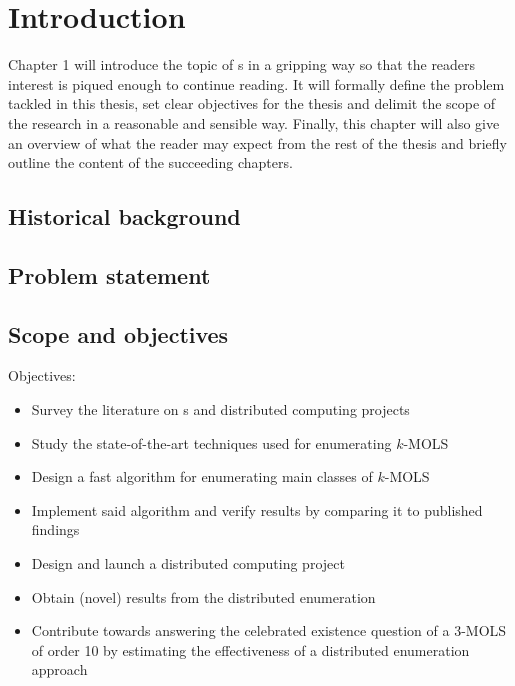 \chapter{Introduction}
\vspace{-2em}
\minitoc
\startarabicpagenumbering %

Chapter 1 will introduce the topic of \lat s in a gripping way so that the readers interest is piqued enough to continue reading. It will formally define the problem tackled in this thesis, set clear objectives for the thesis and delimit the scope of the research in a reasonable and sensible way. Finally, this chapter will also give an overview of what the reader may expect from the rest of the thesis and briefly outline the content of the succeeding chapters.

\section{Historical background}

\section{Problem statement}

\section{Scope and objectives}
Objectives:
\begin{itemize}
\item Survey the literature on \lat  s and distributed computing projects
\item Study the state-of-the-art techniques used for enumerating $k$-MOLS
\item Design a fast algorithm for enumerating main classes of $k$-MOLS
\item Implement said algorithm and verify results by comparing it to published findings
\item Design and launch a distributed computing project
\item Obtain (novel) results from the distributed enumeration
\item Contribute towards answering the celebrated  existence question of a 3-MOLS of order 10 by estimating the effectiveness of a distributed enumeration approach
\end{itemize}

